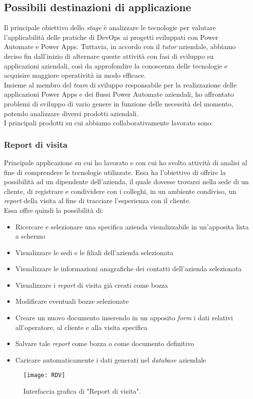 \newpage \subsection{Possibili destinazioni di applicazione}
Il principale obiettivo dello \emph{stage} è analizzare le tecnologie per valutare l'applicabilità delle pratiche di \gls{DevOps} ai progetti sviluppati con Power Automate e Power Apps.
Tuttavia, in accordo con il \emph{tutor} aziendale, abbiamo deciso fin dall'inizio di alternare queste attività con fasi di sviluppo su applicazioni aziendali, così da approfondire la conoscenza delle tecnologie e acquisire maggiore operatività in modo efficace.\\
Insieme al membro del \emph{team} di sviluppo responsabile per la realizzazione delle applicazioni Power Apps e dei flussi Power Automate aziendali, ho affrontato problemi di sviluppo di vario genere in funzione delle necessità del momento, potendo analizzare diversi prodotti aziendali.\\
I principali prodotti su cui abbiamo collaborativamente lavorato sono:

\subsubsection*{Report di visita}
Principale applicazione su cui ho lavorato e con cui ho svolto attività di analisi al fine di comprendere le tecnologie utilizzate.
Essa ha l'obiettivo di offrire la possibilità ad un dipendente dell'azienda, il quale dovesse trovarsi nella sede di un cliente, di registrare e condividere con i colleghi, in un ambiente condiviso, un \emph{report} della visita al fine di tracciare l'esperienza con il cliente.\\
Essa offre quindi la possibilità di: 
\begin{itemize}
    \item Ricercare e selezionare una specifica azienda visualizzabile in un'apposita lista a schermo 
    \item Visualizzare le sedi e le filiali dell'azienda selezionata 
    \item Visualizzare le informazioni anagrafiche dei contatti dell'azienda selezionata  
    \item Visualizzare i \emph{report} di visita già creati come bozza  
    \item Modificare eventuali bozze selezionate 
    \item Creare un nuovo documento inserendo in un apposito \emph{form} i dati relativi all'operatore, al cliente e alla visita specifica 
    \item Salvare tale \emph{report} come bozza o come documento definitivo
    \item Caricare automaticamente i dati generati nel \emph{database} aziendale 
\end{itemize}
\begin{figure}[htbp] 
    \centering 
    \texttt{[image: RDV]} 
    \caption{Interfaccia grafica di "Report di visita".}
    \label{fig:RDV}
\end{figure}


